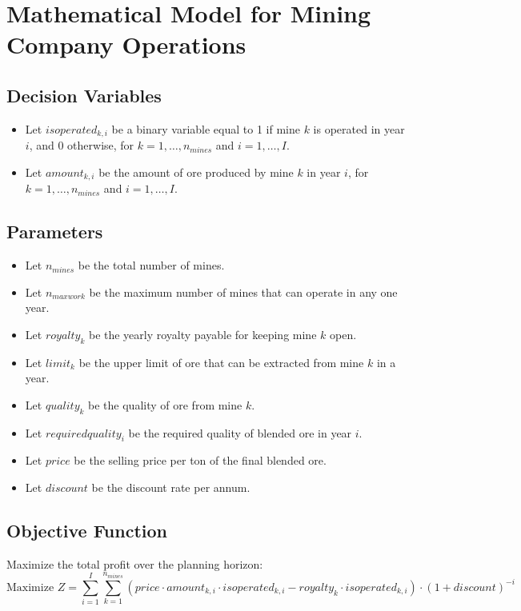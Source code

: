 \documentclass{article}
\begin{document}
\section*{Mathematical Model for Mining Company Operations}

\subsection*{Decision Variables}
\begin{itemize}
    \item Let $isoperated_{k,i}$ be a binary variable equal to 1 if mine $k$ is operated in year $i$, and 0 otherwise, for $k=1,\ldots,n_{mines}$ and $i=1,\ldots,I$.
    \item Let $amount_{k,i}$ be the amount of ore produced by mine $k$ in year $i$, for $k=1,\ldots,n_{mines}$ and $i=1,\ldots,I$.
\end{itemize}

\subsection*{Parameters}
\begin{itemize}
    \item Let $n_{mines}$ be the total number of mines.
    \item Let $n_{maxwork}$ be the maximum number of mines that can operate in any one year.
    \item Let $royalty_k$ be the yearly royalty payable for keeping mine $k$ open.
    \item Let $limit_k$ be the upper limit of ore that can be extracted from mine $k$ in a year.
    \item Let $quality_k$ be the quality of ore from mine $k$.
    \item Let $requiredquality_i$ be the required quality of blended ore in year $i$.
    \item Let $price$ be the selling price per ton of the final blended ore.
    \item Let $discount$ be the discount rate per annum.
\end{itemize}

\subsection*{Objective Function}
Maximize the total profit over the planning horizon:
\[
\text{Maximize } Z = \sum_{i=1}^{I} \sum_{k=1}^{n_{mines}} \left( price \cdot amount_{k,i} \cdot isoperated_{k,i} - royalty_k \cdot isoperated_{k,i} \right) \cdot (1 + discount)^{-i}
\]
\end{document}
